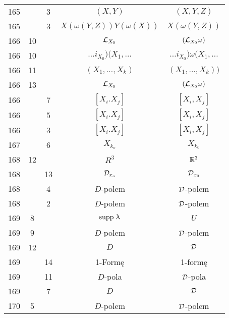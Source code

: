 \documentclass[a4paper,11pt]{article}
\begin{document}
\begin{center}
\begin{tabular}{|c|c|c|c|c|}
    165 & &  3 & $( X, Y )$ & $( X, Y, Z )$ \\
    165 & &  3 & $X( \omega( Y, Z ) ) Y( \omega( X ) )$
           & $X( \omega( Y, Z ) )$ \\
    166 & 10 & & $\mathcal{L}_{ { X_{ 0 } } }$ & $( \mathcal{L}_{ { X_{ 0 } } } \omega )$ \\
    166 & 10 & & $\ldots i_{ { X_{ 0 } } } ) ( X_{ 1 }, \ldots$
           & $\ldots i_{ { X_{ 0 } } } ) \omega( X_{ 1 }, \ldots$ \\
    166 & 11 & & $( X_{ 1 }, \ldots, X_{ k } )$
           & $( X_{ 1 }, \ldots, X_{ k } ))$ \\
    166 & 13 & & $\mathcal{L}_{ { X_{ 0 } } }$
           & $( \mathcal{L}_{ { X_{ 0 } } } \omega )$ \\
    166 & &  7 & $[ X_{ i }. X_{ j } ]$ & $[ X_{ i }, X_{ j } ]$ \\
    166 & &  5 & $[ X_{ i }. X_{ j } ]$ & $[ X_{ i }, X_{ j } ]$ \\
    166 & &  3 & $[ X_{ i }. X_{ j } ]$ & $[ X_{ i }, X_{ j } ]$ \\
    167 & &  6 & $X_{ k_{ o } }$ & $X_{ k_{ 0 } }$ \\
    168 & 12 & & $R^{ 3 }$ & $\mathbb{R}^{ 3 }$ \\
    168 & & 13 & $\mathcal{D}_{ x_{ o } }$ & $\mathcal{D}_{ x_{ 0 } }$ \\
    168 & &  4 & $D$-polem & $\mathcal{D}$-polem \\
    168 & &  2 & $D$-polem & $\mathcal{D}$-polem \\
    169 &  8 & & $\mathrm{supp}\,\, \uplambda$ & $U$ \\
    169 &  9 & & $D$-polem & $\mathcal{D}$-polem \\
    169 & 12 & & $D$ & $\mathcal{D}$ \\
    169 & & 14 & 1-Formę & 1-formę \\
    169 & & 11 & $D$-pola & $\mathcal{D}$-pola \\
    169 & &  7 & $D$ & $\mathcal{D}$ \\
    170 &  5 & & $D$-polem & $\mathcal{D}$-polem  \\
    \hline
  \end{tabular}






\end{center}
\end{document}
